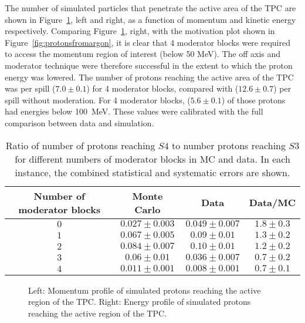 The number of simulated particles that penetrate the active area of the TPC are shown in Figure~\ref{fig:MCTPC}, left and right, as a function of momentum and kinetic energy respectively.
Comparing Figure~\ref{fig:MCTPC}, right, with the motivation plot shown in Figure~\ref{fig:protonsfromargon}, it is clear that 4 moderator blocks were required to access the momentum region of interest (below 50 MeV).
The off axis and moderator technique were therefore successful in the extent to which the proton energy was lowered.
The number of protons reaching the active area of the TPC was  per spill ($7.0 \pm  0.1$) for 4 moderator blocks, compared with ($12.6 \pm 0.7$) per spill without moderation. 
For 4 moderator blocks, ($5.6 \pm  0.1$) of those protons had energies below 100~MeV.
These values were calibrated with the full comparison between data and simulation.

\begin{table}
  \centering
  \caption{Ratio of number of protons reaching $\mathit{S4}$ to number protons reaching $\mathit{S3}$ for different numbers of moderator blocks in MC and data. In each instance, the combined statistical and systematic errors are shown.}
  \begin{tabular}{c|c c c}
    \hline
    \hline
    Number of moderator blocks & Monte Carlo & Data & Data/MC\\
    \hline
    $0$ & $0.027 \pm 0.003$ & $0.049 \pm 0.007$ & $1.8 \pm 0.3$ \\
    $1$ & $0.067 \pm 0.005$ & $0.09 \pm 0.01$ & $1.3 \pm 0.2$ \\
    $2$ & $0.084 \pm 0.007$ & $0.10 \pm 0.01$ & $1.2 \pm 0.2$ \\
    $3$ & $0.06 \pm 0.01$ & $0.036 \pm 0.007$ & $0.7 \pm 0.2$ \\
    $4$ & $0.011 \pm 0.001$ & $0.008 \pm 0.001$ & $0.7 \pm 0.1$ \\
    \hline
  \end{tabular}
  \label{tab:ratios}
\end{table}

\begin{figure}[!ht]
  \begin{minipage}[t]{0.48\textwidth}
    \begin{adjustbox}{max totalsize={\textwidth}{.35\textheight}, center}
      
    \end{adjustbox}
  \end{minipage}
  \hspace{0.3cm}
  \begin{minipage}[t]{0.48\textwidth}
    \begin{adjustbox}{max totalsize={\textwidth}{.35\textheight}, center}
      
    \end{adjustbox}
    
  \end{minipage}
  \caption{Left: Momentum profile of simulated protons reaching the active region of the TPC. Right: Energy profile of simulated protons reaching the active region of the TPC.}
  \label{fig:MCTPC}	
\end{figure}
    
